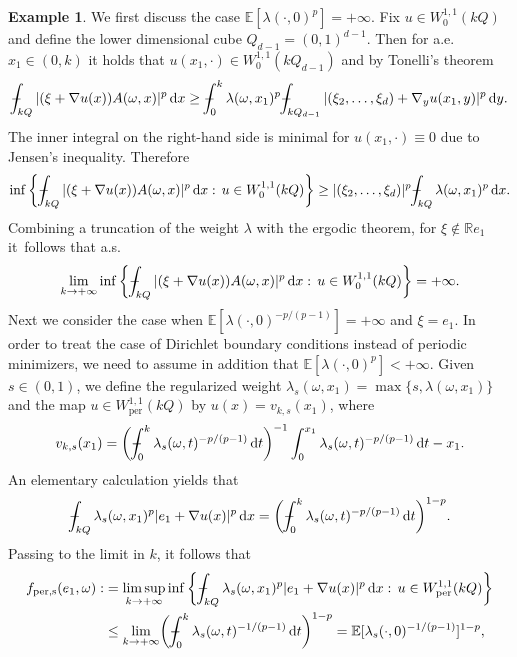 \documentclass[10pt]{amsart}
\theoremstyle{definition}
\newtheorem{example}[theorem]{Example}
\def\Xint#1{\mathchoice
{\XXint\displaystyle\textstyle{#1}}%
{\XXint\textstyle\scriptstyle{#1}}%
{\XXint\scriptstyle\scriptscriptstyle{#1}}%
{\XXint\scriptscriptstyle\scriptscriptstyle{#1}}%
\!\int}
\def\XXint#1#2#3{{\setbox0=\hbox{$#1{#2#3}{\int}$ }
\vcenter{\hbox{$#2#3$ }}\kern-.57\wd0}}
\def\dashint{\Xint-}
\let\w\omega
\newcommand{\dx}{\,\mathrm{d}x}
\newcommand{\dy}{\,\mathrm{d}y}
\newcommand{\R}{\mathbb{R}}
\begin{document}
\begin{example}
We first discuss the case $\mathbb{E}[\lambda(\cdot,0)^p]=+\infty$. Fix $u\in W^{1,1}_0(kQ)$ and define the lower dimensional cube $Q_{d-1}=(0,1)^{d-1}$. Then for a.e.\ $x_1\in (0,k)$ it holds that $u(x_1,\cdot)\in W_0^{1,1}(kQ_{d-1})$ and by Tonelli's theorem
\begin{equation*}
\dashint_{kQ}|(\xi+\nabla u(x))A(\w,x)|^p\dx\geq\dashint_0^k\lambda(\w,x_1)^p \dashint_{kQ_{d-1}}|(\xi_2,\ldots,\xi_d)+\nabla_yu(x_1,y)|^p\dy.
\end{equation*}
The inner integral on the right-hand side is minimal for $u(x_1,\cdot)\equiv 0$ due to Jensen's inequality. Therefore
\begin{equation*}
\inf\left\{\dashint_{kQ}|(\xi+\nabla u(x))A(\w,x)|^p\dx:\,u\in W^{1,1}_0(kQ)\right\}\geq |(\xi_2,\ldots,\xi_d)|^p\dashint_{kQ}\lambda(\w,x_1)^p\dx.
\end{equation*}
Combining a truncation of the weight $\lambda$ with the ergodic theorem, for $\xi\notin\R e_1$ it~follows that a.s.
\begin{equation}\label{eq:toinfinity}
\lim_{k\to +\infty}\inf\left\{\dashint_{kQ}|(\xi+\nabla u(x))A(\w,x)|^p\dx:\,u\in W^{1,1}_0(kQ)\right\}=+\infty.
\end{equation}
Next we consider the case when $\mathbb{E}[\lambda(\cdot,0)^{-p/(p-1)}]=+\infty$ and $\xi=e_1$. In order to treat the case of Dirichlet boundary conditions instead of periodic minimizers, we need to assume in addition that $\mathbb{E}[\lambda(\cdot,0)^p]<+\infty$. Given $s\in (0,1)$, we define the regularized weight $\lambda_s(\w,x_1)=\max\{s,\lambda(\w,x_1)\}$ and the map $u\in W^{1,1}_\mathrm{per}(kQ)$ by $u(x)=v_{k,s}(x_1)$, where
\begin{equation*}
v_{k,s}(x_1)=\biggl(\dashint_0^k\lambda_s(\w,t)^{-p/(p-1)}\,\mathrm{d}t\biggr)^{-1}\int_0^{x_1}\lambda_s(\w,t)^{-p/(p-1)}\,\mathrm{d}t-x_1.
\end{equation*}
An elementary calculation yields that
\begin{align*}
\dashint_{kQ}\lambda_s(\w,x_1)^p|e_1+\nabla u(x)|^p\dx= \biggl(\dashint_0^k\lambda_s(\w,t)^{-p/(p-1)}\,\mathrm{d}t\biggr)^{1-p}.
\end{align*}
Passing to the limit in $k$, it follows that
\begin{align*}
f_\mathrm{per,s}(e_1,\w):&=\limsup_{k\to +\infty}\inf\left\{\dashint_{kQ}\lambda_{s}(\w,x_1)^p|e_1+\nabla u(x)|^p\dx:\,u\in W^{1,1}_\mathrm{per}(kQ)\right\}
\\
&\leq \lim_{k\to +\infty}\biggl(\dashint_0^k\lambda_s(\w,t)^{-1/(p-1)}\,\mathrm{d}t\biggr)^{1-p}=\mathbb{E}[\lambda_s(\cdot,0)^{-1/(p-1)}]^{1-p},

\end{align*}
\end{example}
\end{document}

